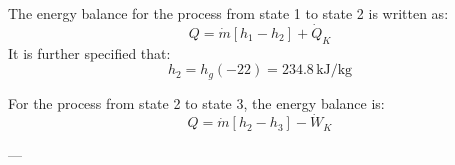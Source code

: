 The energy balance for the process from state 1 to state 2 is written as:  
\[
Q = \dot{m} \left[ h_1 - h_2 \right] + \dot{Q}_K
\]  
It is further specified that:  
\[
h_2 = h_g(-22) = 234.8 \, \text{kJ/kg}
\]  

For the process from state 2 to state 3, the energy balance is:  
\[
Q = \dot{m} \left[ h_2 - h_3 \right] - \dot{W}_K
\]  

---